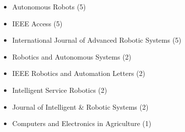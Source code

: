 \begin{itemize}
	\item Autonomous Robots (5)
	\item IEEE Access (5)
	\item International Journal of Advanced Robotic Systems (5)
	\item Robotics and Autonomous Systems (2)
	\item IEEE Robotics and Automation Letters (2)
	\item Intelligent Service Robotics (2)
	\item Journal of Intelligent \& Robotic Systems (2)
	\item Computers and Electronics in Agriculture (1)
\end{itemize}